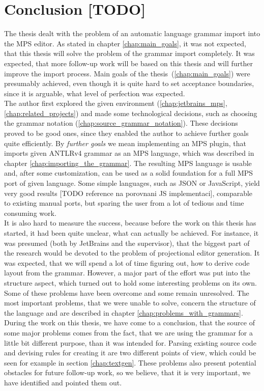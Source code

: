 \chapter{Conclusion [TODO]}

The thesis dealt with the problem of an automatic language grammar import into the MPS editor.
As stated in chapter \ref{chap:main_goals}, it was not expected, that this thesis will solve the problem of the grammar import completely.
It was expected, that more follow-up work will be based on this thesis and will further improve the import process.
Main goals of the thesis~(\ref{chap:main_goals}) were presumably achieved, even though it is quite hard to set acceptance boundaries, since it is arguable, what level of perfection was expected.
\\

The author first explored the given environment (\ref{chap:jetbrains_mps}, \ref{chap:related_projects}) and made some technological decisions, such as choosing the grammar notation (\ref{chap:source_grammar_notation}).
These decisions proved to be good ones, since they enabled the author to achieve further goals quite efficiently.
By \textit{further goals} we mean implementing an MPS plugin, that imports given ANTLRv4 grammar as an MPS language, which was described in chapter \ref{chap:importing_the_grammar}.
The resulting MPS language is usable and, after some customization, can be used as a solid foundation for a full MPS port of given language.
Some simple languages, such as JSON or JavaScript, yield very good results [TODO reference na porovnani JS implementaci], comparable to existing manual ports, but sparing the user from a lot of tedious and time consuming work.
\\

It is also hard to measure the success, because before the work on this thesis has started, it had been quite unclear, what can actually be achieved.
For instance, it was presumed (both by JetBrains and the supervisor), that the biggest part of the research would be devoted to the problem of projectional editor generation.
It was expected, that we will spend a lot of time figuring out, how to derive code layout from the grammar.
However, a major part of the effort was put into the structure aspect, which turned out to hold some interesting problems on its own.
Some of these problems have been overcome and some remain unresolved.
The most important problems, that we were unable to solve, concern the structure of the language and are described in chapter \ref{chap:problems_with_grammars}.
\\

During the work on this thesis, we have come to a conclusion, that the source of some major problems comes from the fact, that we are using the grammar for a little bit different purpose, than it was intended for.
Parsing existing source code and devising rules for creating it are two different points of view, which could be seen for example in section \ref{chap:textgen}.
These problems also present potential obstacles for future follow-up work, so we believe, that it is very important, we have identified and pointed them out.
